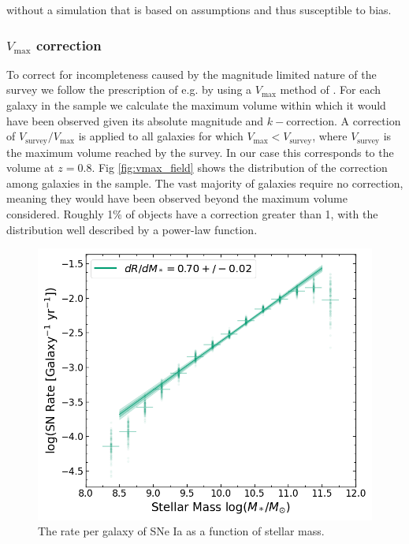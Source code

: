\documentclass[fleqn,usenatbib]{mnras}
\begin{document}
without a simulation that is based on assumptions and thus susceptible to bias.

\subsubsection{$V_{\mathrm{max}}$ correction \label{subsubsec:vmax_corr}}

To correct for incompleteness caused by the magnitude limited nature of the survey we follow the prescription of e.g. \citet{Sullivan2006, Smith2012} by using a $V_{\mathrm{max}}$ method of \citet{Schmidt1968}. For each galaxy in the sample we calculate the maximum volume within which it would have been observed given its absolute magnitude and $k-$correction. A correction of $V_{\mathrm{survey}}/V_{\mathrm{max}}$ is applied to all galaxies for which $V_{\mathrm{max}} < V_{\mathrm{survey}}$, where $V_{\mathrm{survey}}$ is the maximum volume reached by the survey. In our case this corresponds to the volume at $z=0.8$. Fig \ref{fig:vmax_field} shows the distribution of the correction among galaxies in the sample. The vast majority of galaxies require no correction, meaning they would have been observed beyond the maximum volume considered. Roughly 1\% of objects have a correction greater than 1, with the distribution well described by a power-law function. %


\begin{figure}
    \centering
    \includegraphics[width=.5\textwidth]{figs/rate_vs_mass_all.png}
    \caption{The rate per galaxy of SNe Ia as a function of stellar mass.}%
    \label{fig:rate_raw}
\end{figure}
\end{document}
